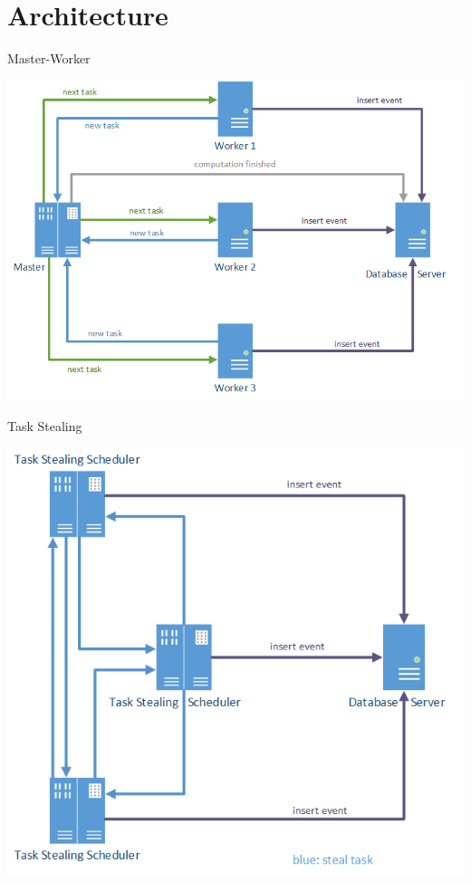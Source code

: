 
\section{Architecture}

	\begin{frame}{Master-Worker}
		\centerline{\includegraphics[scale=0.5]{images/master}}
	\end{frame}
	\begin{frame}{Task Stealing}
		\centerline{\includegraphics[scale=0.5]{images/taskstealing}}
	\end{frame}

